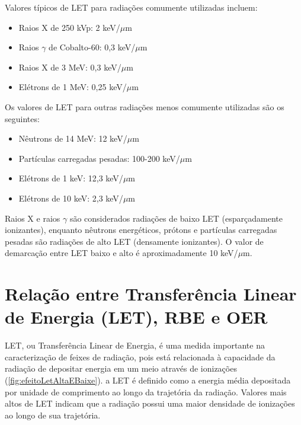 \documentclass[11pt,a4paper]{article}
\begin{document}
	Valores típicos de LET para radiações comumente utilizadas incluem:
	\begin{itemize}
		\item Raios X de 250 kVp: 2 keV/$\mu$m
		\item Raios $\gamma$ de Cobalto-60: 0,3 keV/$\mu$m
		\item Raios X de 3 MeV: 0,3 keV/$\mu$m
		\item Elétrons de 1 MeV: 0,25 keV/$\mu$m
	\end{itemize}

	Os valores de LET para outras radiações menos comumente utilizadas são os seguintes:
	\begin{itemize}
		\item Nêutrons de 14 MeV: 12 keV/$\mu$m
		\item Partículas carregadas pesadas: 100-200 keV/$\mu$m
		\item Elétrons de 1 keV: 12,3 keV/$\mu$m
		\item Elétrons de 10 keV: 2,3 keV/$\mu$m
	\end{itemize}

	Raios X e raios $\gamma$ são considerados radiações de baixo LET (esparçadamente ionizantes), enquanto nêutrons energéticos, prótons e partículas carregadas pesadas são radiações de alto LET (densamente ionizantes). O valor de demarcação entre LET baixo e alto é aproximadamente 10 keV/$\mu$m.

\section{Relação entre Transferência Linear de Energia (LET), RBE e OER}

	LET, ou Transferência Linear de Energia, é uma medida importante na caracterização de feixes de radiação, pois está relacionada à capacidade da radiação de depositar energia em um meio através de ionizações (\ref{fig:efeitoLetAltaEBaixe}). a LET é definido como a energia média depositada por unidade de comprimento ao longo da trajetória da radiação. Valores mais altos de LET indicam que a radiação possui uma maior densidade de ionizações ao longo de sua trajetória.
\end{document}
